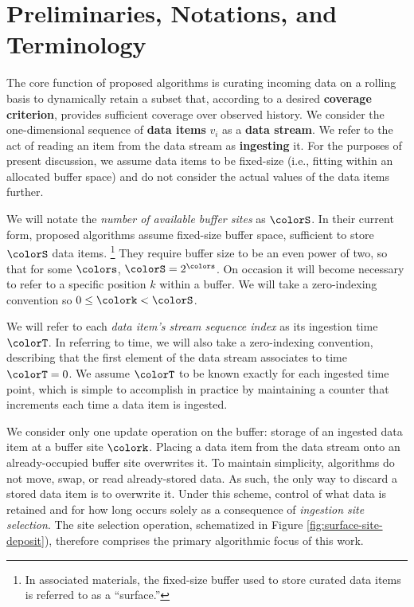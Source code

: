 \section{Preliminaries, Notations, and Terminology} \label{sec:notation}



The core function of proposed algorithms is curating incoming data on a rolling basis to dynamically retain a subset that, according to a desired \textbf{coverage criterion}, provides sufficient coverage over observed history.
We consider the one-dimensional sequence of \textbf{data items} $v_i$ as a \textbf{data stream}.
We refer to the act of reading an item from the data stream as \textbf{ingesting} it.
For the purposes of present discussion, we assume data items to be fixed-size (i.e., fitting within an allocated buffer space) and do not consider the actual values of the data items further.

We will notate the \textit{number of available buffer sites} as $\colorS$.
In their current form, proposed algorithms assume fixed-size buffer space, sufficient to store $\colorS$ data items.%
\footnote{%
In associated materials, the fixed-size buffer used to store curated data items is referred to as a ``surface.''%
}
They require buffer size to be an even power of two, so that for some $\colors$, $\colorS = 2^{\colors}$.
On occasion it will become necessary to refer to a specific position $k$ within a buffer.
We will take a zero-indexing convention so $0 \leq \colork < \colorS$.

We will refer to each \textit{data item's stream sequence index} as its ingestion time $\colorT$.
In referring to time, we will also take a zero-indexing convention, describing that the first element of the data stream associates to time $\colorT=0$.
We assume $\colorT$ to be known exactly for each ingested time point, which is simple to accomplish in practice by maintaining a counter that increments each time a data item is ingested.

We consider only one update operation on the buffer: storage of an ingested data item at a buffer site $\colork$.
Placing a data item from the data stream onto an already-occupied buffer site overwrites it.
To maintain simplicity, algorithms do not move, swap, or read already-stored data.
As such, the only way to discard a stored data item is to overwrite it.
Under this scheme, control of what data is retained and for how long occurs solely as a consequence of \textit{ingestion site selection}.
The site selection operation, schematized in Figure \ref{fig:surface-site-deposit}), therefore comprises the primary algorithmic focus of this work.

